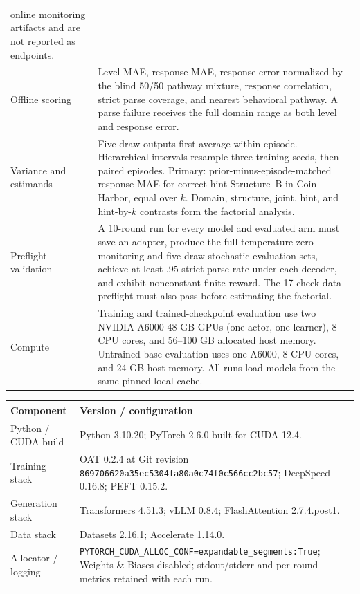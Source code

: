 \begin{center}
\begin{minipage}{\linewidth}
\begin{tabular}{p{.29\linewidth}p{.66\linewidth}}
online monitoring artifacts and are not reported as endpoints. \\
Offline scoring & Level MAE, response MAE, response error normalized by the
blind 50/50 pathway mixture, response correlation, strict parse coverage, and
nearest behavioral pathway. A parse failure receives the full domain range as
both level and response error. \\
Variance and estimands & Five-draw outputs first average within episode.
Hierarchical intervals resample three training seeds, then paired episodes.
Primary: prior-minus-episode-matched response MAE for correct-hint Structure~B in Coin
Harbor, equal over $k$. Domain, structure, joint, hint, and hint-by-$k$ contrasts
form the factorial analysis. \\
Preflight validation & A 10-round run for every model and evaluated arm must
save an adapter, produce the full temperature-zero monitoring and five-draw
stochastic evaluation sets, achieve
at least .95 strict parse rate under each decoder, and exhibit nonconstant finite
reward. The 17-check data preflight must also pass before estimating the factorial. \\
Compute & Training and trained-checkpoint evaluation use two NVIDIA A6000 48-GB
GPUs (one actor, one learner), 8 CPU cores, and 56--100 GB allocated host memory.
Untrained base evaluation uses one A6000, 8 CPU cores, and 24 GB host memory.
All runs load models from the same pinned local cache. \\
\bottomrule
\end{tabular}
\end{minipage}
\end{center}

\begin{center}
\begin{minipage}{\linewidth}
\centering
{}
\label{tab:exp3-runtime}
\scriptsize
\setlength{\tabcolsep}{3pt}
\begin{tabular}{p{.29\linewidth}p{.66\linewidth}}
\toprule
\textbf{Component} & \textbf{Version / configuration} \\
\midrule
Python / CUDA build & Python 3.10.20; PyTorch 2.6.0 built for CUDA 12.4. \\
Training stack & OAT 0.2.4 at Git revision
\texttt{869706620a35ec5304fa80a0\allowbreak{}c74f0c566cc2bc57}; DeepSpeed 0.16.8; PEFT 0.15.2. \\
Generation stack & Transformers 4.51.3; vLLM 0.8.4; FlashAttention 2.7.4.post1. \\
Data stack & Datasets 2.16.1; Accelerate 1.14.0. \\
Allocator / logging & \texttt{PYTORCH\_CUDA\_ALLOC\_CONF=expandable\_segments:True};
Weights \& Biases disabled; stdout/stderr and per-round metrics retained with each
run. \\
\bottomrule
\end{tabular}
\end{minipage}
\end{center}
